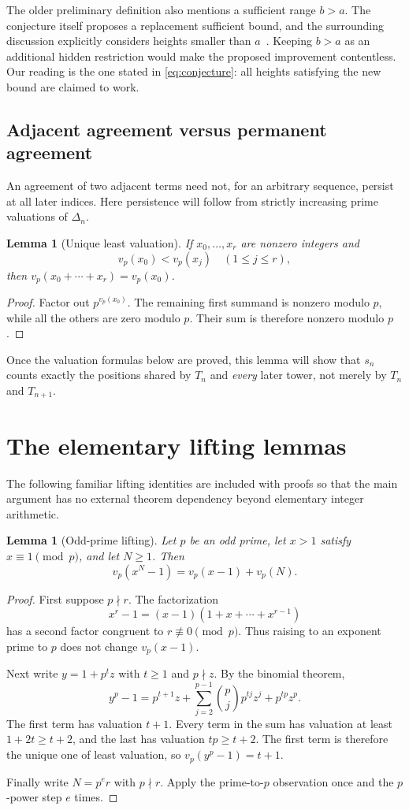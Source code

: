\documentclass[11pt,a4paper]{article}
\newtheorem{lemma}[theorem]{Lemma}
\theoremstyle{definition}
\theoremstyle{remark}
\begin{document}
The older preliminary definition also mentions a sufficient range $b>a$. The conjecture itself proposes a replacement sufficient bound, and the surrounding discussion explicitly considers heights smaller than $a$~\cite[pp.~43--44]{Ripa2021}. Keeping $b>a$ as an additional hidden restriction would make the proposed improvement contentless. Our reading is the one stated in \eqref{eq:conjecture}: all heights satisfying the new bound are claimed to work.

\subsection{Adjacent agreement versus permanent agreement}
An agreement of two adjacent terms need not, for an arbitrary sequence, persist at all later indices. Here persistence will follow from strictly increasing prime valuations of $\Delta_n$.

\begin{lemma}[Unique least valuation]\label{lem:unique}
If $x_0,\ldots,x_r$ are nonzero integers and
\[
 v_p(x_0)<v_p(x_j)\quad(1\le j\le r),
\]
then $v_p(x_0+\cdots+x_r)=v_p(x_0)$.
\end{lemma}
\begin{proof}
Factor out $p^{v_p(x_0)}$. The remaining first summand is nonzero modulo $p$, while all the others are zero modulo $p$. Their sum is therefore nonzero modulo $p$.
\end{proof}

Once the valuation formulas below are proved, this lemma will show that $s_n$ counts exactly the positions shared by $T_n$ and \emph{every} later tower, not merely by $T_n$ and $T_{n+1}$.

\section{The elementary lifting lemmas}
\label{sec:lte}
The following familiar lifting identities are included with proofs so that the main argument has no external theorem dependency beyond elementary integer arithmetic.

\begin{lemma}[Odd-prime lifting]\label{lem:oddLTE}
Let $p$ be an odd prime, let $x>1$ satisfy $x\equiv1\pmod p$, and let $N\ge1$. Then
\[
 v_p(x^N-1)=v_p(x-1)+v_p(N).
\]
\end{lemma}
\begin{proof}
First suppose $p\nmid r$. The factorization
\[
 x^r-1=(x-1)(1+x+\cdots+x^{r-1})
\]
has a second factor congruent to $r\not\equiv0\pmod p$. Thus raising to an exponent prime to $p$ does not change $v_p(x-1)$.

Next write $y=1+p^t z$ with $t\ge1$ and $p\nmid z$. By the binomial theorem,
\[
 y^p-1=p^{t+1}z+
 \sum_{j=2}^{p-1}\binom pj p^{tj}z^j+p^{tp}z^p.
\]
The first term has valuation $t+1$. Every term in the sum has valuation at least $1+2t\ge t+2$, and the last has valuation $tp\ge t+2$. The first term is therefore the unique one of least valuation, so $v_p(y^p-1)=t+1$.

Finally write $N=p^e r$ with $p\nmid r$. Apply the prime-to-$p$ observation once and the $p$-power step $e$ times.
\end{proof}
\end{document}
